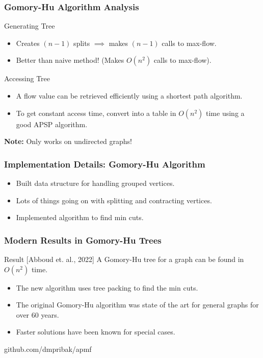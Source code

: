 \documentclass[mathserif]{beamer}
\begin{document}
\begin{frame}
	\frametitle{Gomory-Hu Algorithm Analysis}
		\begin{block}{Generating Tree}		
		\begin{itemize}
			\item Creates $(n-1)$ splits $\implies$ makes $(n-1)$ calls to max-flow.\\
			\item Better than naive method! (Makes $O(n^2)$ calls to max-flow).\\
		\end{itemize}
		\end{block}

		\begin{block}{Accessing Tree}
			\begin{itemize}
		\item A flow value can be retrieved efficiently using a shortest path algorithm.\\
		\item To get constant access time, convert into a table in $O(n^2)$ time using a good APSP algorithm.
		\end{itemize}
		\end{block}

		\textbf{Note:} Only works on undirected graphs!
\end{frame}

\begin{frame}
	\frametitle{Implementation Details: Gomory-Hu Algorithm}
	\begin{itemize}
		\item Built data structure for handling grouped vertices.
		\item Lots of things going on with splitting and contracting vertices.
		\item Implemented algorithm to find min cuts.
	\end{itemize}
	
\end{frame}

\begin{frame}
	\frametitle{Modern Results in Gomory-Hu Trees}	
	\begin{block}{Result [Abboud et. al., 2022]}
		A Gomory-Hu tree for a graph can be found in $O(n^2)$ time.
	\end{block}
	\begin{itemize}
		\item The new algorithm uses tree packing to find the min cuts.
		\item The original Gomory-Hu algorithm was state of the art for general graphs for over 60 years.
		\item Faster solutions have been known for special cases.
	\end{itemize}

\end{frame}

\begin{frame}[standout]
	github.com/dmpribak/apmf
	
\end{frame}
\end{document}
